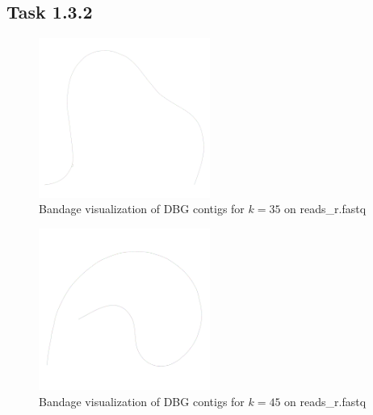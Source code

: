 \documentclass[12pt]{article}
\begin{document}
\subsection{Task 1.3.2}

\begin{figure}[h!]
    \centering
    \includegraphics[width=0.5\textwidth]{../toy_dataset/r-k-35.png}
    \caption{Bandage visualization of DBG contigs for $k=35$ on reads\_r.fastq}
    \label{fig:dbg_k_35}
\end{figure} 

\begin{figure}[h!]
    \centering
    \includegraphics[width=0.5\textwidth]{../toy_dataset/r-k-45.png}
    \caption{Bandage visualization of DBG contigs for $k=45$ on reads\_r.fastq}
    \label{fig:dbg_k_45}
\end{figure} 
\end{document}
